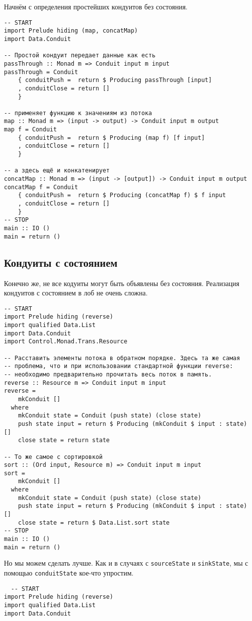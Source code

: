 {Начнём с определения простейших кондуитов без состояния.
\begin{lstlisting}
-- START
import Prelude hiding (map, concatMap)
import Data.Conduit

-- Простой кондуит передает данные как есть
passThrough :: Monad m => Conduit input m input
passThrough = Conduit
    { conduitPush =  return $ Producing passThrough [input]
    , conduitClose = return []
    }

-- применяет функцию к значениям из потока
map :: Monad m => (input -> output) -> Conduit input m output
map f = Conduit
    { conduitPush =  return $ Producing (map f) [f input]
    , conduitClose = return []
    }

-- а здесь ещё и конкатенирует
concatMap :: Monad m => (input -> [output]) -> Conduit input m output
concatMap f = Conduit
    { conduitPush =  return $ Producing (concatMap f) $ f input
    , conduitClose = return []
    }
-- STOP
main :: IO ()
main = return ()
\end{lstlisting}

\subsection{Кондуиты с состоянием}
Конечно же, не все кодуиты могут быть объявлены без состояния.  Реализация 
кондуитов с состоянием в лоб не очень сложна.
\begin{lstlisting}
-- START
import Prelude hiding (reverse)
import qualified Data.List
import Data.Conduit
import Control.Monad.Trans.Resource

-- Расставить элементы потока в обратном порядке. Здесь та же самая
-- проблема, что и при использовании стандартной функции reverse:
-- необходимо предварительно прочитать весь поток в память.
reverse :: Resource m => Conduit input m input
reverse =
    mkConduit []
  where
    mkConduit state = Conduit (push state) (close state)
    push state input = return $ Producing (mkConduit $ input : state) []
    close state = return state

-- То же самое с сортировкой
sort :: (Ord input, Resource m) => Conduit input m input
sort =
    mkConduit []
  where
    mkConduit state = Conduit (push state) (close state)
    push state input = return $ Producing (mkConduit $ input : state) []
    close state = return $ Data.List.sort state
-- STOP
main :: IO ()
main = return ()
\end{lstlisting} 
Но мы можем сделать лучше. Как и в случаях с \lstinline'sourceState' и 
\lstinline'sinkState', мы с помощью \lstinline'conduitState' кое-что упростим.
\begin{lstlisting}
  -- START
import Prelude hiding (reverse)
import qualified Data.List
import Data.Conduit


\end{lstlisting}}
